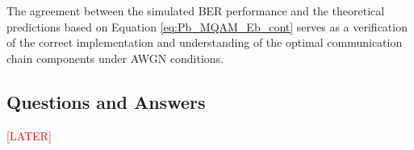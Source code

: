 The agreement between the simulated BER performance and the theoretical predictions based on Equation \ref{eq:Pb_MQAM_Eb_cont} serves as a verification of the correct implementation and understanding of the optimal communication chain components under AWGN conditions.


\subsection{Questions and Answers}
\textcolor{red}{[LATER]}